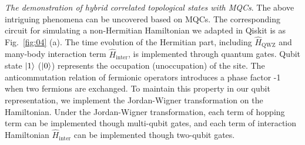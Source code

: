 \documentclass[longbibliography, aps, prx, amsmath, amssymb, amsfonts, twocolumn,superscriptaddress, footinbib]{revtex4-1}
\begin{document}
	\textit{The demonstration of hybrid correlated topological states with MQCs}.
	The above intriguing phenomena can be uncovered based on MQCs. The corresponding circuit for simulating a non-Hermitian Hamiltonian we adapted in Qiskit is as Fig.~\ref{fig:04} (a). The time evolution of the Hermitian part, including $\hat{H}_{\text{QWZ}}$ and many-body interaction term $\hat{H}_{\text{inter}}$, is implemented through quantum gates. 
	Qubit state $\ket{1}$ ($\ket{0}$) represents the occupation (unoccupation) of the site. 
	The anticommutation relation of fermionic operators introduces a phase factor -1 when two fermions are exchanged. To maintain this property in our qubit representation, we implement the Jordan-Wigner transformation on the Hamiltonian.
	Under the Jordan-Wigner transformation, each term of hopping term can be implemented though multi-qubit gates, and each term of interaction Hamiltonian $\hat{H}_{\text{inter}}$ can be implemented though two-qubit gates.
\end{document}

